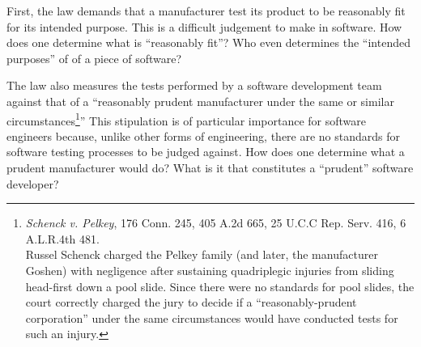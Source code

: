 First, the law demands that a manufacturer test its product to be reasonably fit
for its intended purpose.
 This is a
difficult judgement to make in software. How does one determine what is
``reasonably fit''? Who even determines the ``intended purposes'' of of a piece
of software?

The law also measures the tests performed by a software development team against
that of a ``reasonably prudent manufacturer under the same or similar 
circumstances\footnote{\textit{Schenck v. Pelkey}, 176 Conn. 245,
405 A.2d 665, 25 U.C.C Rep. Serv. 416, 6 A.L.R.4th 481.\\Russel Schenck charged
the Pelkey family (and later, the manufacturer Goshen) with negligence after
sustaining quadriplegic injuries from sliding head-first down a pool slide.
Since there were no standards for pool slides, the court correctly charged the
jury to decide if a ``reasonably-prudent corporation'' under the same 
circumstances would have conducted tests for such an injury.}'' This stipulation
is of particular importance for software engineers because, unlike other forms
of engineering, there are no standards for software testing processes to be
judged against. How does one
determine what a prudent manufacturer would do? What is it that constitutes a
``prudent'' software developer?

